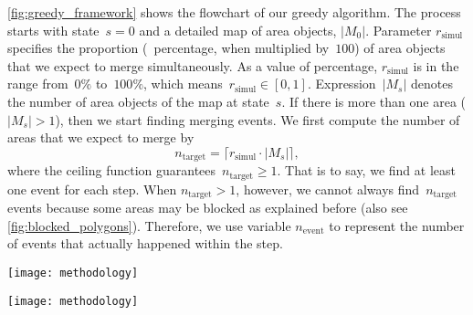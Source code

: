 \documentclass[twocolumn]{svjour3}          %
\begin{document}
\fig\ref{fig:greedy_framework} shows the flowchart of our greedy algorithm.
The process starts with state~$s=0$ and a detailed map of area objects, $|M_0|$.
Parameter $r_\mathrm{simul}$ specifies 
the proportion (\ie~percentage, when multiplied by~$100$) of area objects that
we expect to merge simultaneously.
As a value of percentage, 
$r_\mathrm{simul}$ is in the range from~$0\%$ to~$100\%$,
which means~$r_\mathrm{simul} \in [0,1]$.
Expression~$|M_s|$ denotes the number of area objects of the map at state~$s$.
If there is more than one area ($|M_s|>1$),
then we start finding merging events.
We first compute the number of areas that we expect to merge by
\begin{equation}
\label{eq:n_target}
n_\mathrm{target} =
\lceil r_\mathrm{simul} \cdot |M_s| \rceil,
\end{equation}
where the ceiling function guarantees~$n_\mathrm{target}\ge 1$.
That is to say, we find at least one event for each step.
When $n_\mathrm{target} > 1$, however,
we cannot always find~$n_\mathrm{target}$ events
because some areas may be blocked as explained before
(also see \fig\ref{fig:blocked_polygons}).
Therefore, we use variable $n_\mathrm{event}$
to represent the number of events that actually happened within the step. 


\begin{figure*}[tb]
\centering
\texttt{[image: methodology]}
\caption{The flowchart of our greedy algorithm.
}
\label{fig:greedy_framework}
\end{figure*}


\begin{figure*}[tb]
\centering
\texttt{[image: methodology]}
\caption{The process of finding simultaneous merging events for a step, 
    where simultaneous parameter $r_\mathrm{simul} = 0.3$.
    (a) From all the free areas,
	the least important one is selected to merge into
	its most compatible neighbor.
	Then the surrounding areas are blocked (marked by the crosses).
	(b) Next, the least important area from the remaining free areas
	is selected to merge with the most compatible neighbor,
	and the surrounding areas are also blocked.
}
\label{fig:blocked_polygons}
\end{figure*}
\end{document}
